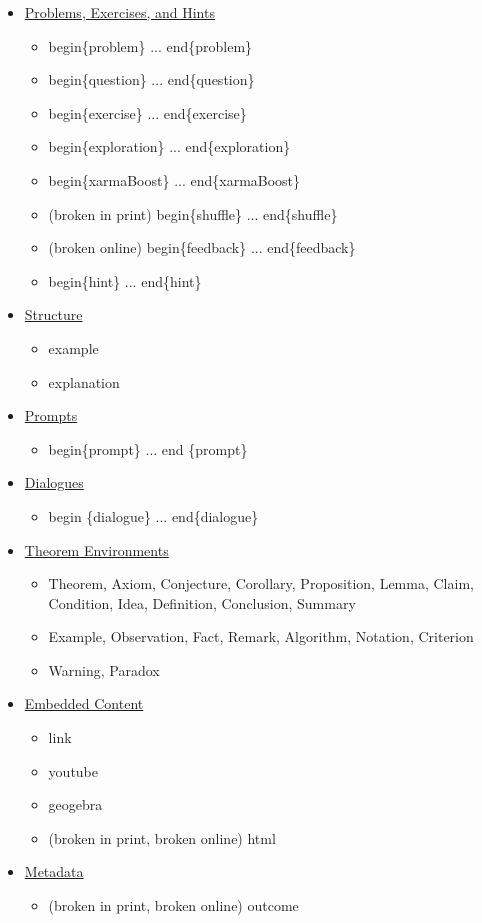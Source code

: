 \documentclass{ximera}
\begin{document}
\begin{remark}
\begin{itemize}
\begin{itemize}
  \end{itemize}
\item \hyperref[ProblemContainers]{Problems, Exercises, and Hints}
  \begin{itemize}
    \item begin\{problem\} ... end\{problem\}
    \item begin\{question\} ... end\{question\}
    \item begin\{exercise\} ... end\{exercise\}
    \item begin\{exploration\} ... end\{exploration\}
    \item begin\{xarmaBoost\} ... end\{xarmaBoost\}
    \item (broken in print) begin\{shuffle\} ... end\{shuffle\}
    \item (broken online) begin\{feedback\} ... end\{feedback\}
    \item begin\{hint\} ... end\{hint\}
  \end{itemize}
\item \hyperref[StructuralEnvironments]{Structure}
  \begin{itemize}
    \item example
    \item explanation
  \end{itemize}
\item \hyperref[Prompt]{Prompts}
  \begin{itemize}
    \item begin\{prompt\} ... end \{prompt\}
  \end{itemize}
\item \hyperref[Dialogue]{Dialogues}
  \begin{itemize}
    \item begin \{dialogue\} ... end\{dialogue\}
  \end{itemize}
\item \hyperref[TheoremEnvironments]{Theorem Environments}
  \begin{itemize}
    \item Theorem, Axiom, Conjecture, Corollary, Proposition, Lemma, Claim, Condition, Idea, Definition, Conclusion, Summary
    \item Example, Observation, Fact, Remark, Algorithm, Notation, Criterion
    \item Warning, Paradox
  \end{itemize}
\item \hyperref[EmbeddedContent]{Embedded Content}
  \begin{itemize}
    \item link
    \item youtube
    \item geogebra
    \item (broken in print, broken online) html
  \end{itemize}
\item \hyperref[Metadata]{Metadata}
  \begin{itemize}
    \item (broken in print, broken online) outcome
  \end{itemize}


\end{itemize}
\end{remark}
\end{document}
